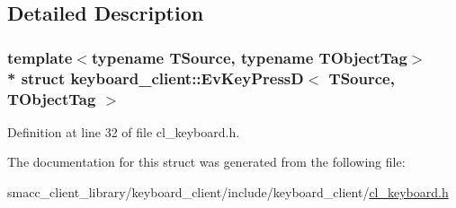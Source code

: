 \subsection{Detailed Description}
\subsubsection*{template$<$typename T\+Source, typename T\+Object\+Tag$>$\\*
struct keyboard\+\_\+client\+::\+Ev\+Key\+Press\+D$<$ T\+Source, T\+Object\+Tag $>$}



Definition at line 32 of file cl\+\_\+keyboard.\+h.



The documentation for this struct was generated from the following file\+:\begin{DoxyCompactItemize}
\item 
smacc\+\_\+client\+\_\+library/keyboard\+\_\+client/include/keyboard\+\_\+client/\hyperlink{cl__keyboard_8h}{cl\+\_\+keyboard.\+h}\end{DoxyCompactItemize}
